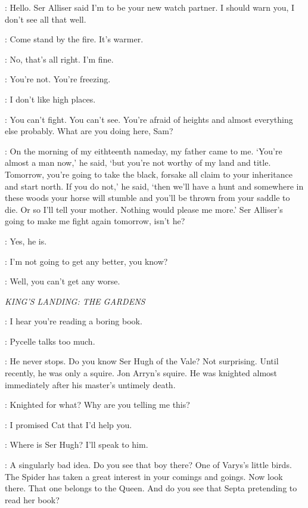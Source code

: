 \SAM: Hello. Ser Alliser said I'm to be your new watch partner. I should warn you, I don't see all that well. 

\JON: Come stand by the fire. It's warmer. 

\SAM: No, that's all right. I'm fine. 

\JON: You're not. You're freezing. 

\SAM: I don't like high places. 

\JON: You can't fight. You can't see. You're afraid of heights and almost everything else probably. What are you doing here, Sam? 

\SAM: On the morning of my eithteenth nameday, my father came to me. `You're almost a man now,' he said, `but you're not worthy of my land and title. Tomorrow, you're going to take the black, forsake all claim to your inheritance and start north. If you do not,' he said, `then we'll have a hunt and somewhere in these woods your horse will stumble and you'll be thrown from your saddle to die. Or so I'll tell your mother. Nothing would please me more.' Ser Alliser's going to make me fight again tomorrow, isn't he? 

\JON: Yes, he is. 

\SAM: I'm not going to get any better, you know? 

\JON: Well, you can't get any worse. 

\scene

\textit{KING'S LANDING: THE GARDENS}


\LITTLEFINGER: I hear you're reading a boring book. 

\NED: Pycelle talks too much. 

\LITTLEFINGER: He never stops. Do you know Ser Hugh of the Vale? Not surprising. Until recently, he was only a squire. Jon Arryn's squire. He was knighted almost immediately after his master's untimely death. 

\NED: Knighted for what? Why are you telling me this? 

\LITTLEFINGER: I promised Cat that I'd help you. 

\NED: Where is Ser Hugh? I'll speak to him. 

\LITTLEFINGER: A singularly bad idea. Do you see that boy there? One of Varys's little birds. The Spider has taken a great interest in your comings and goings. Now look there. That one belongs to the Queen. And do you see that Septa pretending to read her book? 


